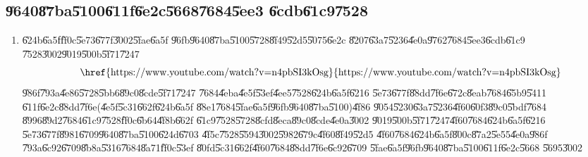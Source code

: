 \documentclass[12pt,a4paper]{article}
\begin{document}
\bigskip

\subsection{\U{9640}\U{87ba}\U{5100}\U{611f}\U{6e2c}\U{5668}\U{7684}\U{5ee3}%
\U{6cdb}\U{61c9}\U{7528}}

\begin{enumerate}
\item \U{624b}\U{6a5f}\U{ff0c}\U{5e73}\U{677f}\U{3002}\U{5fae}\U{6a5f}%
\U{96fb}\U{9640}\U{87ba}\U{5100}\U{5728}\U{8f49}\U{52d5}\U{5075}\U{6e2c}%
\U{8207}\U{63a7}\U{5236}\U{4e0a}\U{9762}\U{7684}\U{5ee3}\U{6cdb}\U{61c9}%
\U{7528}\U{3002}\U{9019}\U{500b}\U{5f71}\U{7247}%
\begin{equation*}
\text{\href{https://www.youtube.com/watch?v=n4pbSI3kOsg}{%
https://www.youtube.com/watch?v=n4pbSI3kOsg}}
\end{equation*}%
\U{986f}\U{793a}\U{4e86}\U{5728}\U{5bb6}\U{89c0}\U{8cde}\U{5f71}\U{7247}%
\U{7684}\U{4eba}\U{4e5f}\U{53ef}\U{4ee5}\U{7528}\U{624b}\U{6a5f}\U{6216}%
\U{5e73}\U{677f}\U{88dd}\U{7f6e}\U{672c}\U{8eab}\U{7684}\U{65b9}\U{5411}%
\U{611f}\U{6e2c}\U{88dd}\U{7f6e}(\U{4e5f}\U{5c31}\U{662f}\U{624b}\U{6a5f}%
\U{88e1}\U{7684}\U{5fae}\U{6a5f}\U{96fb}\U{9640}\U{87ba}\U{5100})\U{4f86}%
\U{9054}\U{5230}\U{63a7}\U{5236}\U{4f60}\U{60f3}\U{89c0}\U{5bdf}\U{7684}%
\U{8996}\U{89d2}\U{7684}\U{61c9}\U{7528}\U{ff0c}\U{6b64}\U{4f8b}\U{662f}%
\U{61c9}\U{7528}\U{5728}\U{8cfd}\U{8eca}\U{89c0}\U{8cde}\U{4e0a}\U{3002}%
\U{9019}\U{500b}\U{5f71}\U{7247}\U{4f60}\U{7684}\U{624b}\U{6a5f}\U{6216}%
\U{5e73}\U{677f}\U{8981}\U{6709}\U{9640}\U{87ba}\U{5100}\U{624d}\U{6703}%
\U{4f5c}\U{7528}\U{5594}\U{3002}\U{5982}\U{679c}\U{4f60}\U{8f49}\U{52d5}%
\U{4f60}\U{7684}\U{624b}\U{6a5f}\U{800c}\U{87a2}\U{5e55}\U{4e0a}\U{986f}%
\U{793a}\U{6c92}\U{6709}\U{8b8a}\U{5316}\U{7684}\U{8a71}\U{ff0c}\U{53ef}%
\U{80fd}\U{5c31}\U{662f}\U{4f60}\U{7684}\U{88dd}\U{7f6e}\U{6c92}\U{6709}%
\U{5fae}\U{6a5f}\U{96fb}\U{9640}\U{87ba}\U{5100}\U{611f}\U{6e2c}\U{5668}%
\U{5695}\U{3002}


\end{enumerate}
\end{document}
